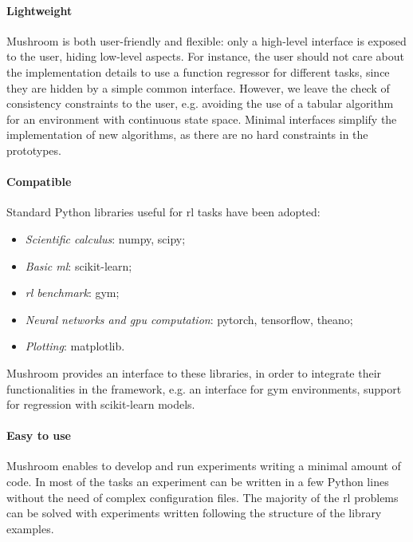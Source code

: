 \paragraph{Lightweight}
Mushroom is both user-friendly and flexible: only a high-level interface is exposed to the user, hiding low-level aspects. For instance, the user should not care about the implementation details to use a function regressor for different tasks, since they are hidden by a simple common interface. However, we leave the check of consistency constraints to the user, e.g. avoiding the use of a tabular algorithm for an environment with continuous state space. Minimal interfaces simplify the implementation of new algorithms, as there are no hard constraints in the prototypes.
\paragraph{Compatible}
Standard Python libraries useful for \gls{rl} tasks have been adopted:
\begin{itemize}
 \item \textit{Scientific calculus}: numpy, scipy;
 \item \textit{Basic \gls{ml}}: scikit-learn;
 \item \textit{\gls{rl} benchmark}: gym;
 \item \textit{Neural networks and \gls{gpu} computation}: pytorch, tensorflow, theano;
 \item \textit{Plotting}: matplotlib.
\end{itemize}
Mushroom provides an interface to these libraries, in order to integrate their functionalities in the framework, e.g. an interface for gym environments, support for regression with scikit-learn models.

\paragraph{Easy to use}
Mushroom enables to develop and run experiments writing a minimal amount of code. In most of the tasks an experiment can be written in a few Python lines without the need of complex configuration files. The majority of the \gls{rl} problems can be solved with experiments written following the structure of the library examples.

